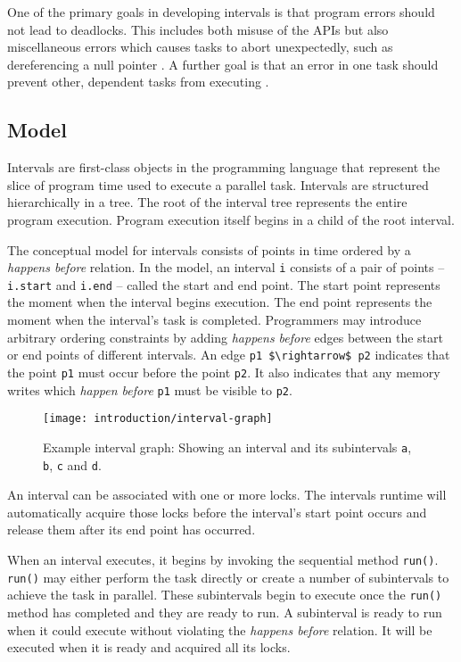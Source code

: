 One of the primary goals in developing intervals is that program
errors should not lead to deadlocks. This includes both misuse of the
APIs but also miscellaneous errors which causes tasks to abort
unexpectedly, such as dereferencing a null pointer
\cite{Matsakis2009}. A further goal is that an error in one task
should prevent other, dependent tasks from executing
\cite{Matsakis2010a}.

\subsection{Model}
\label{sec:intro-intervals-model}

Intervals are first-class objects in the programming language that
represent the slice of program time used to execute a parallel
task. Intervals are structured hierarchically in a tree. The root of
the interval tree represents the entire program execution. Program
execution itself begins in a child of the root interval.

The conceptual model for intervals consists of points in time ordered
by a \emph{happens before} relation. In the model, an interval
\lstinline|i| consists of a pair of points -- \lstinline|i.start| and
\lstinline|i.end| -- called the start and end point. The start point
represents the moment when the interval begins execution. The end
point represents the moment when the interval's task is
completed. Programmers may introduce arbitrary ordering constraints by
adding \emph{happens before} edges between the start or end points of
different intervals. An edge \lstinline|p1 $\rightarrow$ p2| indicates
that the point \lstinline|p1| must occur before the point
\lstinline|p2|. It also indicates that any memory writes which
\emph{happen before} \lstinline|p1| must be visible to
\lstinline|p2|.

\begin{figure}[htb]
  \centering
  \texttt{[image: introduction/interval-graph]}
  \caption[Example interval graph]{Example interval graph: Showing an
    interval and its subintervals \lstinline|a|, \lstinline|b|,
    \lstinline|c| and \lstinline|d|.}
  \label{fig:interval-graph}
\end{figure}

An interval can be associated with one or more locks. The intervals
runtime will automatically acquire those locks before the interval's
start point occurs and release them after its end point has occurred.

When an interval executes, it begins by invoking the sequential method
\lstinline|run()|. \lstinline|run()| may either perform the task
directly or create a number of subintervals to achieve the task in
parallel. These subintervals begin to execute once the
\lstinline|run()| method has completed and they are ready to run. A
subinterval is ready to run when it could execute without violating
the \emph{happens before} relation. It will be executed when it is
ready and acquired all its locks.

